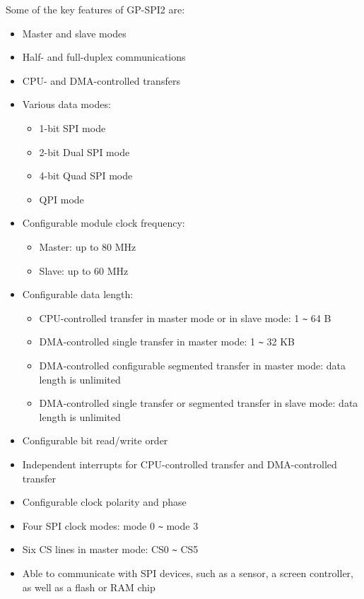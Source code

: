 \documentclass[main\_\_EN.tex]{subfiles}
\begin{document}
Some of the key features of GP-SPI2 are:
\begin{itemize}
    \item Master and slave modes
    \item Half- and full-duplex communications
    \item CPU- and DMA-controlled transfers
    \item Various data modes:
        \begin{itemize}
            \item 1-bit SPI mode
            \item 2-bit Dual SPI mode
            \item 4-bit Quad SPI mode
            \item QPI mode
        \end{itemize}
    \item Configurable module clock frequency:
        \begin{itemize}
            \item Master: up to 80 MHz
            \item Slave: up to 60 MHz
        \end{itemize}
    \item Configurable data length:
    \begin{itemize}
        \item CPU-controlled transfer in master mode or in slave mode: 1 \verb+~+ 64 B
        \item DMA-controlled single transfer in master mode: 1 \verb+~+ 32 KB
        \item DMA-controlled configurable segmented transfer in master mode: data length is unlimited
        \item DMA-controlled single transfer or segmented transfer in slave mode: data length is unlimited
    \end{itemize}
    \item Configurable bit read/write order
    \item Independent interrupts for CPU-controlled transfer and DMA-controlled transfer
    \item Configurable clock polarity and phase
    \item Four SPI clock modes: mode 0 \verb+~+ mode 3
    \item Six CS lines in master mode: CS0 \verb+~+ CS5
    \item Able to communicate with SPI devices, such as a sensor, a screen controller, as well as a flash or RAM chip
\end{itemize}
\end{document}
